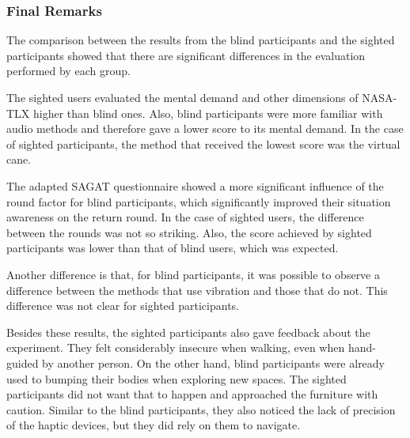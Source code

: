 


\subsubsection{Final Remarks}

The comparison between the results from the blind participants and the sighted participants showed that there are significant differences in the evaluation performed by each group.

The sighted users evaluated the mental demand and other dimensions of NASA-TLX higher than blind ones. Also, blind participants were more familiar with audio methods and therefore gave a lower score to its mental demand. In the case of sighted participants, the method that received the lowest score was the virtual cane. 

The adapted SAGAT questionnaire showed a more significant influence of the round factor for blind participants, which significantly improved their situation awareness on the return round. In the case of sighted users, the difference between the rounds was not so striking. Also, the score achieved by sighted participants was lower than that of blind users, which was expected.

Another difference is that, for blind participants, it was possible to observe a difference between the methods that use vibration and those that do not. This difference was not clear for sighted participants. 

Besides these results, the sighted participants also gave feedback about the experiment. They felt considerably insecure when walking, even when hand-guided by another person. On the other hand, blind participants were already used to bumping their bodies when exploring new spaces. The sighted participants did not want that to happen and approached the furniture with caution. Similar to the blind participants, they also noticed the lack of precision of the haptic devices, but they did rely on them to navigate.